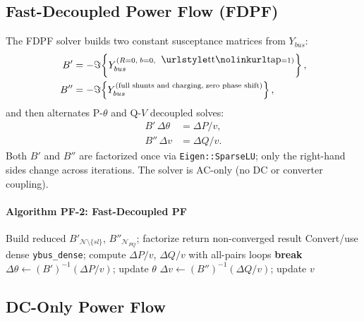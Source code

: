 \subsection{Fast-Decoupled Power Flow (FDPF)}

The FDPF solver builds two constant susceptance matrices from \(Y_{bus}\):
\begin{align}
B' &= -\Im\!\left\{Y_{bus}^{(R=0,\;b=0,\;\texttt{tap}=1)}\right\}, \\
B'' &= -\Im\!\left\{Y_{bus}^{(\text{full shunts and charging,\;zero phase shift})}\right\},
\end{align}
and then alternates P-\(\theta\) and Q-\(V\) decoupled solves:
\begin{align}
B'\,\Delta\theta &= \Delta P / v, \\
B''\,\Delta v &= \Delta Q / v.
\end{align}
Both \(B'\) and \(B''\) are factorized once via \texttt{Eigen::SparseLU}; only
the right-hand sides change across iterations.  The solver is AC-only (no DC or
converter coupling).

\paragraph{Algorithm PF-2: Fast-Decoupled PF}
\begin{algorithmic}[1]
  \State Build reduced $B'_{\mathcal{N}\setminus\{sl\}}$, $B''_{\mathcal{N}_{PQ}}$; factorize
   return non-converged result \EndIf
    \State Convert/use dense \texttt{ybus\_dense}; compute $\Delta P/v$, $\Delta Q/v$ with all-pairs loops
     \textbf{break} \EndIf
    \State $\Delta\theta \gets (B')^{-1}(\Delta P/v)$; update $\theta$
    \State $\Delta v \gets (B'')^{-1}(\Delta Q/v)$; update $v$
  \EndFor
\EndProcedure
\end{algorithmic}

\subsection{DC-Only Power Flow}

